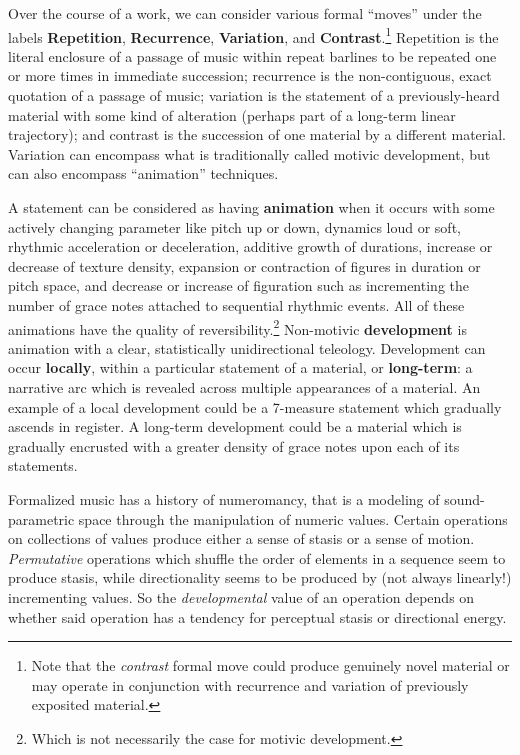 Over the course of a work, we can consider various formal ``moves'' under the labels \textbf{Repetition}, \textbf{Recurrence}, \textbf{Variation}, and \textbf{Contrast}.\footnote{Note that the \textit{contrast} formal move could produce genuinely novel material or may operate in conjunction with recurrence and variation of previously exposited material.} Repetition is the literal enclosure of a passage of music within repeat barlines to be repeated one or more times in immediate succession; recurrence is the non-contiguous, exact quotation of a passage of music; variation is the statement of a previously-heard material with some kind of alteration (perhaps part of a long-term linear trajectory); and contrast is the succession of one material by a different material. Variation can encompass what is traditionally called motivic development, but can also encompass ``animation'' techniques.

A statement can be considered as having \textbf{animation} when it occurs with some actively changing parameter like pitch up or down, dynamics loud or soft, rhythmic acceleration or deceleration, additive growth of durations, increase or decrease of texture density, expansion or contraction of figures in duration or pitch space, and decrease or increase of figuration such as incrementing the number of grace notes attached to sequential rhythmic events. All of these animations have the quality of reversibility.\footnote{Which is not necessarily the case for motivic development.} Non-motivic \textbf{development} is animation with a clear, statistically unidirectional teleology. Development can occur \textbf{locally}, within a particular statement of a material, or \textbf{long-term}: a narrative arc which is revealed across multiple appearances of a material. An example of a local development could be a 7-measure statement which gradually ascends in register. A long-term development could be a material which is gradually encrusted with a greater density of grace notes upon each of its statements.

Formalized music has a history of numeromancy, that is a modeling of sound-parametric space through the manipulation of numeric values. Certain operations on collections of values produce either a sense of stasis or a sense of motion. \textit{Permutative} operations which shuffle the order of elements in a sequence seem to produce stasis, while directionality seems to be produced by (not always linearly!) incrementing values. So the \textit{developmental} value of an operation depends on whether said operation has a tendency for perceptual stasis or directional energy.

